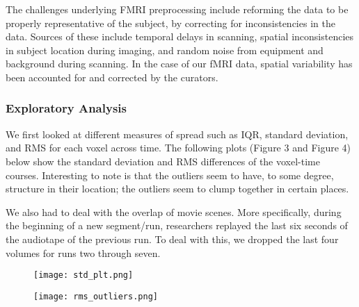 \par The challenges underlying FMRI preprocessing include reforming the data to be properly representative of the subject, by correcting for inconsistencies in the data. Sources of these include temporal delays in scanning, spatial inconsistencies in subject location during imaging, and random noise from equipment and background during scanning. In the case of our fMRI data, spatial variability has been accounted for and corrected by the curators.

\subsubsection{Exploratory Analysis}
\par We first looked at different measures of spread such as IQR, standard deviation, and RMS for each voxel across time. The following plots (Figure 3 and Figure 4) below show the standard deviation and RMS differences of the voxel-time courses. Interesting to note is that the outliers seem to have, to some degree, structure in their location; the outliers seem to clump together in certain places. 
\par We also had to deal with the overlap of movie scenes. More specifically, during the beginning of a new segment/run, researchers replayed the last six seconds of the audiotape of the previous run. To deal with this, we dropped the last four volumes for runs two through seven. 

\begin{figure}[H]
\centering
\begin{minipage}{.5\textwidth}
  \centering
  \texttt{[image: std\_plt.png]}
  \label{fig:test3}
\end{minipage}%
\begin{minipage}{.5\textwidth}
  \centering
  \texttt{[image: rms\_outliers.png]}
  \label{fig:test4}
\end{minipage}
\end{figure}


